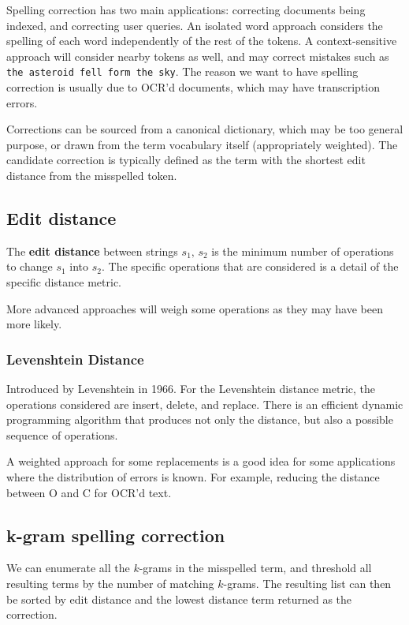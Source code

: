 \documentclass{idc_msc}
\begin{document}
Spelling correction has two main applications: correcting documents being indexed, and correcting user queries.
An isolated word approach considers the spelling of each word independently of the rest of the tokens.
A context-sensitive approach will consider nearby tokens as well, and may correct mistakes such as \texttt{the asteroid fell form the sky}.
The reason we want to have spelling correction is usually due to OCR'd documents, which may have transcription errors.

Corrections can be sourced from a canonical dictionary, which may be too general purpose, or drawn from the term vocabulary itself (appropriately weighted).
The candidate correction is typically defined as the term with the shortest edit distance from the misspelled token.

\subsection{Edit distance}

The \textbf{edit distance} between strings \(s_1,\,s_2\) is the minimum number of operations to change \(s_1\) into \(s_2\).
The specific operations that are considered is a detail of the specific distance metric.

More advanced approaches will weigh some operations as they may have been more likely.

\subsubsection{Levenshtein Distance}

Introduced by Levenshtein in 1966\cite{levenshtein1966binary}.
For the Levenshtein distance metric, the operations considered are insert, delete, and replace.
There is an efficient dynamic programming algorithm that produces not only the distance, but also a possible sequence of operations.

A weighted approach for some replacements is a good idea for some applications where the distribution of errors is known.
For example, reducing the distance between O and C for OCR'd text.

\subsection{k-gram spelling correction}

We can enumerate all the \(k\)-grams in the misspelled term, and threshold all resulting terms by the number of matching \(k\)-grams.
The resulting list can then be sorted by edit distance and the lowest distance term returned as the correction.
\end{document}

